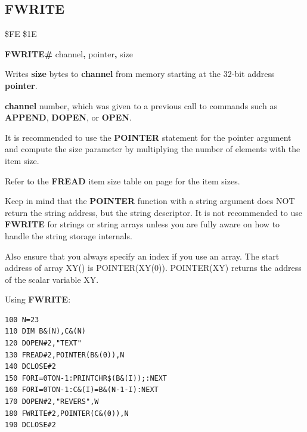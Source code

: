 
\newpage
\subsection{FWRITE}
\begin{description}[leftmargin=2cm,style=nextline]
\item [Token:] \$FE \$1E
\item [Format:] {\bf FWRITE\#} channel{\bf,} pointer{\bf,} size
\item [Usage:] Writes {\bf size} bytes to {\bf channel} from memory
               starting at the 32-bit address {\bf pointer}.

               {\bf channel} number, which was given to a previous
               call to commands such as {\bf APPEND}, {\bf DOPEN}, or {\bf OPEN}.

               It is recommended to use the {\bf POINTER} statement
               for the pointer argument and compute the size parameter
               by multiplying the number of elements with the item size.

               Refer to the {\bf FREAD} item size table on page \pageref{freadtable}
               for the item sizes.

Keep in mind that the {\bf POINTER} function with a string argument
does NOT return the string address, but the string descriptor.
It is not recommended to use {\bf FWRITE} for strings or string arrays
unless you are fully aware on how to handle the string storage internals.


Also ensure that you always specify an index if you use an array.
The start address of array XY() is POINTER(XY(0)).
POINTER(XY) returns the address of the scalar variable XY.


\item [Example:] Using {\bf FWRITE}:
\begin{tcolorbox}[colback=black,coltext=white]
\verbatimfont{\codefont}
\begin{verbatim}
100 N=23
110 DIM B&(N),C&(N)
120 DOPEN#2,"TEXT"
130 FREAD#2,POINTER(B&(0)),N
140 DCLOSE#2
150 FORI=0TON-1:PRINTCHR$(B&(I));:NEXT
160 FORI=0TON-1:C&(I)=B&(N-1-I):NEXT
170 DOPEN#2,"REVERS",W
180 FWRITE#2,POINTER(C&(0)),N
190 DCLOSE#2
\end{verbatim}
\end{tcolorbox}
\end{description}


